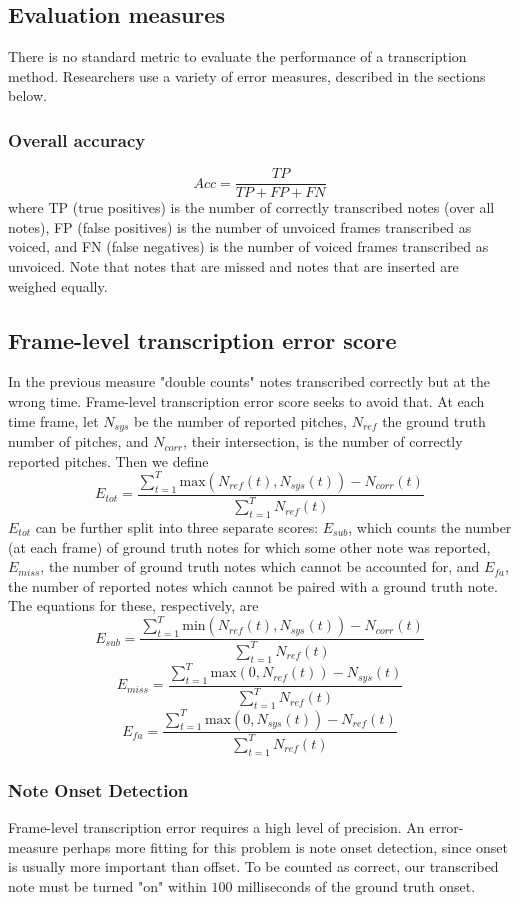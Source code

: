 \documentclass[5p]{elsarticle}
\begin{document}
\subsection{Evaluation measures}


There is no standard metric to evaluate the performance of a transcription method. Researchers use a variety of error measures, described in the sections below.

\subsubsection{Overall accuracy}
$$Acc = \frac{TP}{TP+FP+FN} $$
where TP (true positives) is the number of correctly transcribed notes (over all notes), FP (false positives) is the number of unvoiced frames transcribed as voiced, and FN (false negatives) is the number of voiced frames transcribed as unvoiced. Note that notes that are missed and notes that are inserted are weighed equally.
\subsection{Frame-level transcription error score}
In the previous measure "double counts" notes transcribed correctly but at the wrong time.  Frame-level transcription error score seeks to avoid that.
At each time frame, let $N_{sys}$ be the number of reported pitches, $N_{ref}$ the ground truth number of pitches, and $N_{corr}$, their intersection, is the number of correctly reported pitches.  Then we define
$$E_{tot}=\frac{\sum_{t=1}^T \text{max}(N_{ref}(t),N_{sys}(t))-N_{corr}(t)}{\sum_{t=1}^T N_{ref}(t)}$$
$E_{tot}$ can be further split into three separate scores: $E_{sub}$, which counts the number (at each frame) of ground truth notes for which some other note was reported, $E_{miss}$, the number of ground truth notes which cannot be accounted for, and $E_{fa}$, the number of reported notes which cannot be paired with a ground truth note.  The equations for these, respectively, are
$$E_{sub}=\frac{\sum_{t=1}^T \text{min}(N_{ref}(t),N_{sys}(t))-N_{corr}(t)}{\sum_{t=1}^T N_{ref}(t)}$$
$$E_{miss}=\frac{\sum_{t=1}^T \text{max}(0,N_{ref}(t))-N_{sys}(t)}{\sum_{t=1}^T N_{ref}(t)}$$
$$E_{fa}=\frac{\sum_{t=1}^T \text{max}(0,N_{sys}(t))-N_{ref}(t)}{\sum_{t=1}^T N_{ref}(t)}$$

\subsubsection{Note Onset Detection}
Frame-level transcription error requires a high level of precision.  An error-measure perhaps more fitting for this problem is note onset detection, since onset is usually more important than offset.  To be counted as correct, our transcribed note must be turned "on" within $100$ milliseconds of the ground truth onset.
\end{document}
